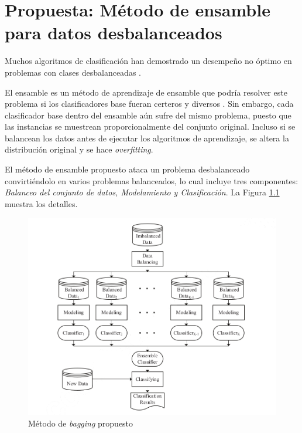 \chapter{Propuesta: Método de ensamble para datos desbalanceados}




Muchos algoritmos de clasificación han demostrado un desempeño no óptimo en problemas con clases desbalanceadas \citep{batista2004study, mani2003knn, seiffert2010rusboost}.

El ensamble es un método de aprendizaje de ensamble que podría resolver este problema si los clasificadores base fueran certeros y diversos \citep{breiman1996bagging}. Sin embargo, cada clasificador base dentro del ensamble aún sufre del mismo problema, puesto que las instancias se muestrean proporcionalmente del conjunto original. Incluso si se balancean los datos antes de ejecutar los algoritmos de aprendizaje, se altera la distribución original y se hace \textit{overfitting}.

El método de ensamble propuesto \citep{sun2015novel} ataca un problema desbalanceado convirtiéndolo en varios problemas balanceados, lo cual incluye tres componentes: \textit{Balanceo del conjunto de datos, Modelamiento y Clasificación}. La Figura \ref{fig:bagging-imbalanced} muestra los detalles.

\begin{figure}
    \centering
    \includegraphics[width=\linewidth]{graficos/bagging_imbalanced.png}
    \caption{Método de \textit{bagging} propuesto \citep{sun2015novel}}
    \label{fig:bagging-imbalanced}
\end{figure}

